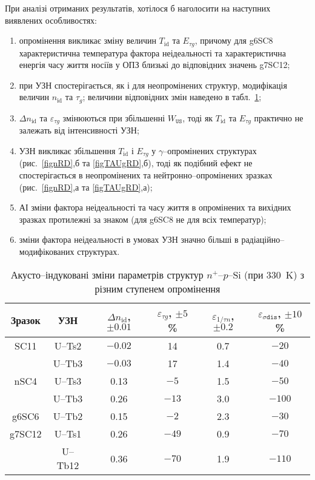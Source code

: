 При аналізі отриманих результатів, хотілося б наголосити на наступних виявлених особливостях:
\begin{enumerate}[label=\asbuk*),leftmargin=0em,itemindent=1.5em]
\item опромінення викликає зміну величин  $T_{\mathrm{id}}$ та $E_{\tau g}$, причому
 для  g6SC8 характеристична температура фактора неідеальності та характеристична енергія часу життя носіїв у ОПЗ
 близькі до відповідних значень  g7SC12;

\item при УЗН спостерігається, як і для неопромінених структур, модифікація величин $n_{\mathrm{id}}$ та $\tau_g$;
  величини відповідних змін наведено в табл.~\ref{tabAIchangeRD};

\item $\Delta n_{\mathrm{id}}$ та $\varepsilon_{\tau g}$ змінюються при збільшенні $W_{\mathtt{US}}$,
 тоді як $T_{\mathrm{id}}$ та $E_{\tau g}$ практично не залежать від інтенсивності УЗН;

\item УЗН викликає збільшення  $T_{\mathrm{id}}$ і $E_{\tau g}$ у $\gamma$--опромінених структурах
(рис.~\ref{fignRD},б та \ref{figTAUgRD},б),
тоді як подібний ефект не спостерігається в неопромінених та нейтронно--опромінених зразках
(рис.~\ref{fignRD},а та \ref{figTAUgRD},а);

\item АІ зміни фактора неідеальності та часу життя в опромінених та вихідних зразках протилежні за знаком
 (для g6SC8 не для всіх температур);

\item зміни фактора неідеальності в умовах УЗН значно більші в радіаційно--модифікованих структурах.
\end{enumerate}


\begin{table}
\caption{\label{tabAIchangeRD}Акусто--індуковані зміни параметрів структур $n^+$--$p$--Si (при 330~K) з різним ступенем опромінення
}
\center
\begin{tabular}{|c|c|c|c|c|c|} \hline
Зразок&УЗН&$\Delta n_{\mathrm{id}}$, $\pm0.01$&$\varepsilon_{\tau g}$, $\pm5$\%&$\varepsilon_{1/\tau n}$, $\pm0.2$&$\varepsilon_{\sigma\mathtt{dis}}$, $\pm10$\%\\
\hline
SC11&U--Ts2&$-0.02$&14&0.7&$-20$\\
&U--Tb3&$-0.03$&17&1.4&$-40$\\ \hline
nSC4&U--Ts3&0.13&$-5$&1.5&$-50$\\
&U--Tb3&0.26&$-13$&3.0&$-100$\\ \hline
g6SC6&U--Tb2&0.15&$-2$&2.3&$-30$\\ \hline
g7SC12&U--Ts1&0.26&$-49$&0.9&$-70$\\
&U--Tb12&0.36&$-70$&1.9&$-110$\\ \hline
\end{tabular}
\end{table}

